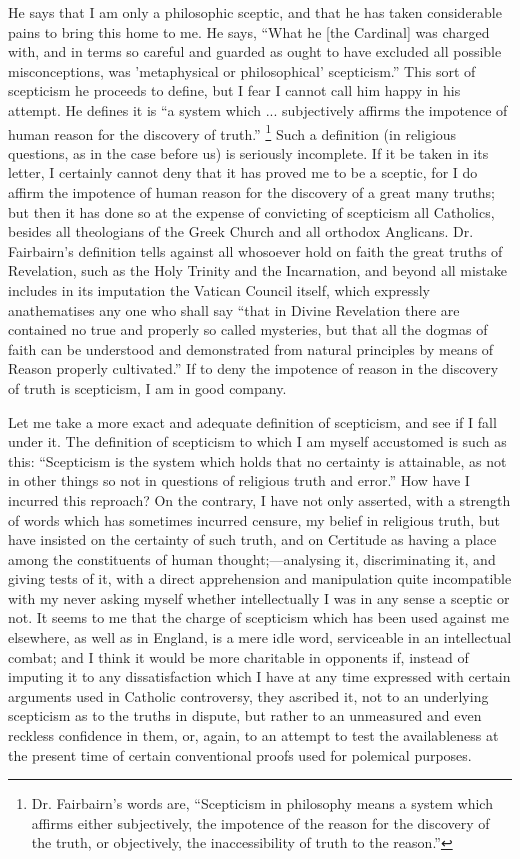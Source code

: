 He says that I am only a philosophic sceptic, and
that he has taken considerable pains to bring this home to me. He
says, ``What he [the Cardinal] was charged with, and in terms so
careful and guarded as ought to have excluded all possible
misconceptions, was 'metaphysical or philosophical' scepticism.''
This sort of scepticism he proceeds to define, but I fear I cannot
call him happy in his attempt. He defines it is ``a system which ...
subjectively affirms the impotence of human reason for the discovery
of truth.'' \footnote{Dr. Fairbairn's words are, ``Scepticism in philosophy means a
system which affirms either subjectively, the impotence of the reason
for the discovery of the truth, or objectively, the inaccessibility of
truth to the reason.''} Such a
definition (in religious questions, as in the case before us) is
seriously incomplete. If it be taken in its letter, I certainly cannot
deny that it has proved me to be a sceptic, for I do affirm the
impotence of human reason for the discovery of a great many truths;
but then it has done so at the expense of convicting of scepticism all
Catholics, besides all theologians of the Greek Church and all
orthodox Anglicans. Dr. Fairbairn's definition tells against all
whosoever hold on faith the great truths of Revelation, such as the
Holy Trinity and the Incarnation, and beyond all mistake includes in
its imputation the Vatican Council itself, which expressly
anathematises any one who shall say ``that in Divine Revelation there
are contained no true and properly so called mysteries, but that all
the dogmas of faith can be understood and demonstrated from natural
principles by means of Reason properly cultivated.'' If to deny the
impotence of reason in the discovery of truth is scepticism, I am in
good company.

Let me take a more exact and adequate definition
of scepticism, and see if I fall under it. The definition of
scepticism to which I am myself accustomed is such as this: ``Scepticism
is the system which holds that no certainty is attainable, as not in
other things so not in questions of religious truth and error.'' How
have I incurred this reproach? On the contrary, I have not only
asserted, with a strength of words which has sometimes incurred
censure, my belief in religious truth, but have insisted on the
certainty of such truth, and on Certitude as having a place among the
constituents of human thought;—analysing it, discriminating it, and
giving tests of it, with a direct apprehension and manipulation quite
incompatible with my never asking myself whether intellectually I was
in any sense a sceptic or not. It seems to me that the charge of
scepticism which has been used against me elsewhere, as well as in
England, is a mere idle word, serviceable in an intellectual combat;
and I think it would be more charitable in opponents if, instead of
imputing it to any dissatisfaction which I have at any time expressed
with certain arguments used in Catholic controversy, they ascribed it,
not to an underlying scepticism as to the truths in dispute, but
rather to an unmeasured and even reckless confidence in them, or,
again, to an attempt to test the availableness at the present time of
certain conventional proofs used for polemical purposes.

